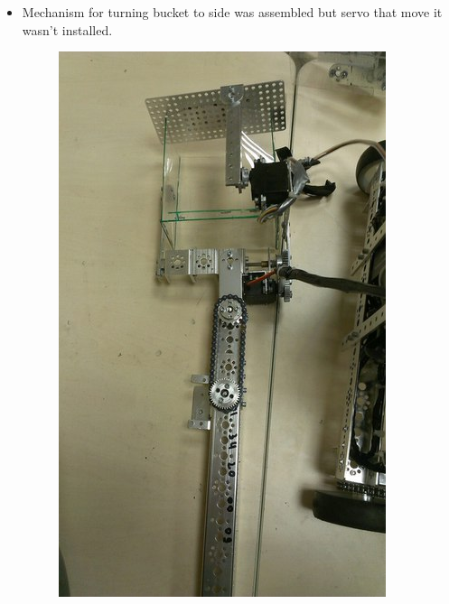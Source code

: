 \begin{itemize}
	\item Mechanism for turning bucket to side was assembled but servo that move it wasn't installed.
	\begin{figure}[H]
		\begin{minipage}[h]{0.45\linewidth}
			{\includegraphics[scale=0.45]{days_L/Meetings/images/09}}
		\end{minipage}
		\hfill
		\begin{minipage}[h]{0.5\linewidth}

\end{minipage}
\end{figure}
\end{itemize}
